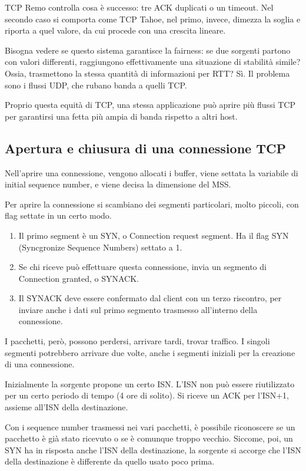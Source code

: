 TCP Remo controlla cosa \`e successo: tre ACK duplicati o un timeout. Nel secondo caso si comporta come TCP Tahoe, nel primo, invece, dimezza la soglia e riporta  a quel valore, da cui procede con una crescita lineare.

Bisogna vedere se questo sistema garantisce la fairness: se due sorgenti partono con valori differenti, raggiungono effettivamente una situazione di stabilit\`a simile? Ossia, trasmettono la stessa quantit\`a di informazioni per RTT? S\`i. Il problema sono i flussi UDP, che rubano banda a quelli TCP.

Proprio questa equit\`a di TCP, una stessa applicazione pu\`o aprire pi\`u flussi TCP per garantirsi una fetta pi\`u ampia di banda rispetto a altri host.

\subsection{Apertura e chiusura di una connessione TCP}

Nell'aprire una connessione, vengono allocati i buffer, viene settata la variabile di initial sequence number, e viene decisa la dimensione del MSS.

Per aprire la connessione si scambiano dei segmenti particolari, molto piccoli, con flag settate in un certo modo.

\begin{enumerate}
    \item Il primo segment \`e un SYN, o Connection request segment. Ha il flag SYN (Syncgronize Sequence Numbers) settato a 1.
    \item Se chi riceve pu\`o effettuare questa connessione, invia un segmento di Connection granted, o SYNACK.
    \item Il SYNACK deve essere confermato dal client con un terzo riscontro, per inviare anche i dati sul primo segmento trasmesso all'interno della connessione.
\end{enumerate}

I pacchetti, per\`o, possono perdersi, arrivare tardi, trovar traffico. I singoli segmenti potrebbero arrivare due volte, anche i segmenti iniziali per la creazione di una connessione.

Inizialmente la sorgente propone un certo ISN. L'ISN non pu\`o essere riutilizzato per un certo periodo di tempo (4 ore di solito). Si riceve un ACK per l'ISN+1, assieme all'ISN della destinazione.

Con i sequence number trasmessi nei vari pacchetti, \`e possibile riconoscere se un pacchetto \`e gi\`a stato ricevuto o se \`e comunque troppo vecchio. Siccome, poi, un SYN ha in risposta anche l'ISN della destinazione, la sorgente si accorge che l'ISN della destinazione \`e differente da quello usato poco prima.

